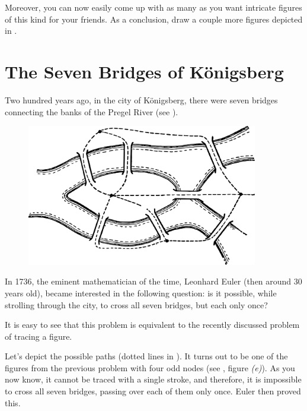 Moreover, you can now easily come up with as many as you want intricate figures of this kind for your friends. As a conclusion, draw a couple more figures depicted in .


\section{The Seven Bridges of K\"onigsberg}
\label{sec-10.10}

Two hundred years ago, in the city of K\"onigsberg, there were seven bridges connecting the banks of the Pregel River (see ).


\begin{figure}[h!]
\centering
\includegraphics[width=0.9\textwidth]{figures/ch-10/fig-157.pdf}
\end{figure}


In 1736, the eminent mathematician of the time, Leonhard Euler (then around 30 years old), became interested in the following question: is it possible, while strolling through the city, to cross all seven bridges, but each only once?

It is easy to see that this problem is equivalent to the recently discussed problem of tracing a figure.

Let's depict the possible paths (dotted lines in ). It turns out to be one of the figures from the previous problem with four odd nodes (see , figure \emph{(e)}). As you now know, it cannot be traced with a single stroke, and therefore, it is impossible to cross all seven bridges, passing over each of them only once. Euler then proved this.



